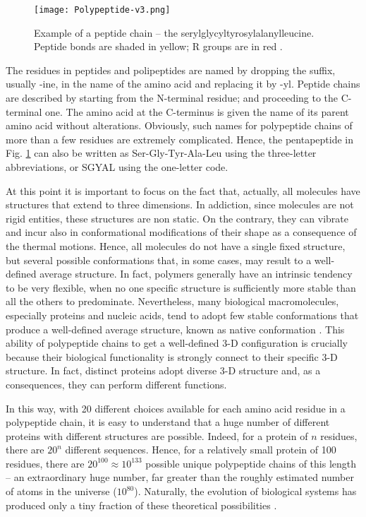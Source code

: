 \begin{figure}[h]
\centering
\begin{minipage}[t]{0.8\textwidth}
\centering
\texttt{[image: Polypeptide-v3.png]}

\caption{\small{Example of a peptide chain -- the serylglycyltyrosylalanylleucine. Peptide bonds are shaded in yellow; R groups are in red
\cite{nelson2008lehninger}.}}

\label{fig:PentaPeptide}
\end{minipage} 
\end{figure}

The residues in peptides and polipeptides are named by dropping the suffix, usually -ine, in the name of the amino acid and replacing it by -yl. Peptide chains are described by starting from the N-terminal residue;  and proceeding to the C-terminal one. The amino acid at the C-terminus is given the name of its parent amino acid without alterations. Obviously, such names for polypeptide chains of more than a few residues are extremely complicated. Hence, the pentapeptide in Fig. \ref{fig:PentaPeptide} can also be written as Ser-Gly-Tyr-Ala-Leu using the three-letter abbreviations, or SGYAL using the one-letter code.

At this point it is important to focus on the fact that, actually, all molecules have structures that extend to three dimensions. In addiction, since molecules are not rigid entities, these structures are non static. On the contrary, they can vibrate and incur also in conformational modifications of their shape as a consequence of the thermal motions. Hence, all molecules do not have a single fixed structure, but several possible conformations that, in some cases, may result to a well-defined average structure.
In fact, polymers generally have an intrinsic tendency to be very flexible, when no one specific structure is sufficiently more stable than all the others to predominate. Nevertheless, many biological macromolecules, especially proteins and nucleic acids, tend to adopt few stable conformations that produce a well-defined average structure, known as native conformation
\cite{nelson2008lehninger}. This ability of polypeptide chains to get a well-defined 3-D configuration is crucially because their biological functionality is strongly connect to their specific 3-D structure. In fact, distinct proteins adopt diverse 3-D structure and, as a consequences, they can perform different functions. 

In this way, with 20 different choices available for each amino acid residue in a polypeptide chain, it is easy to understand that a huge number of different proteins with different structures are possible. Indeed, for a protein of $n$ residues, there are $20^n$ different sequences. Hence, for a relatively small protein of 100 residues, there are $20^{100} \approx 10^{133}$ possible unique polypeptide chains of this length -- an extraordinary huge number, far greater than the roughly estimated number of atoms in the universe ($10^{80}$). Naturally, the evolution of biological systems has produced only a tiny fraction of these theoretical possibilities \cite{creighton2010biophysical}. 

